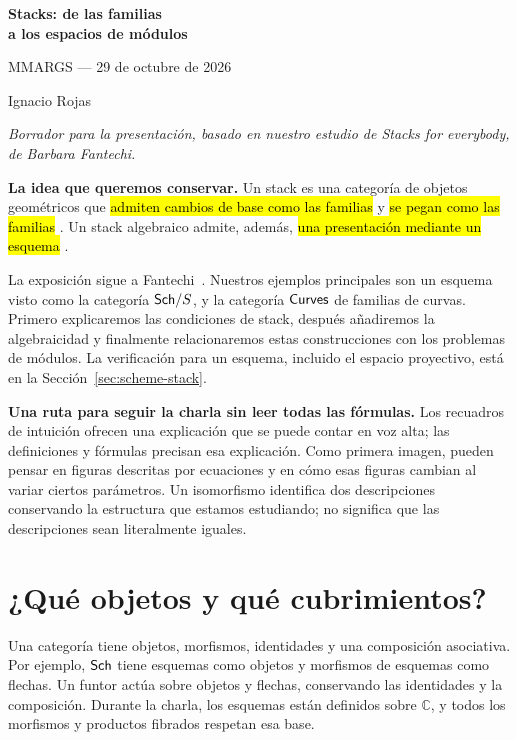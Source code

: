 \documentclass[12pt,openany]{memoir}
\makeatletter
\newcommand{\roundedhighlight}[1]{%
  \begingroup
  \setuloverlap{2pt}%
  \def\SOUL@ulunderline##1{{%
    \setbox\z@\hbox{##1}%
    \rlap{\SOUL@ulcolor{\tikz[overlay,blend mode=darken]{%
      \fill[rounded corners=2pt]
        (-\SOUL@uloverlap,-\SOUL@uldp)
        rectangle (\dimexpr\wd\z@+\SOUL@uloverlap\relax,\SOUL@ulht);%
    }}}%
    \unhcopy\z@
  }}%
  \hl{#1}%
  \endgroup
}
\DeclareRobustCommand{\hlblue}[1]{{\sethlcolor{noteblue}\roundedhighlight{#1}}}
\DeclareRobustCommand{\hlgreen}[1]{{\sethlcolor{notegreen}\roundedhighlight{#1}}}
\DeclareRobustCommand{\hlpink}[1]{{\sethlcolor{notepink}\roundedhighlight{#1}}}
\makeatother
\begin{document}
\thispagestyle{plain}

\begin{center}
  {\LARGE\bfseries Stacks: de las familias\\ a los espacios de módulos}\par
  \vspace{.5em}
  {\large MMARGS --- 29 de octubre de 2026}\par
  \vspace{.35em}
  Ignacio Rojas\par
  {\small\itshape Borrador para la presentación, basado en nuestro estudio de
  \emph{Stacks for everybody}, de Barbara Fantechi.}
\end{center}

\begin{ptcb}
\textbf{La idea que queremos conservar.}
Un stack es una categoría de objetos geométricos que
\hlgreen{admiten cambios de base como las familias} y
\hlblue{se pegan como las familias}. Un stack algebraico admite, además,
\hlpink{una presentación mediante un esquema}.
\end{ptcb}

La exposición sigue a Fantechi~\cite{fantechi}. Nuestros ejemplos principales
son un esquema visto como la categoría \(\mathsf{Sch}/S\), y la categoría
\(\mathsf{Curves}\) de familias de curvas. Primero explicaremos las condiciones de
stack, después añadiremos la algebraicidad y finalmente relacionaremos estas
construcciones con los problemas de módulos. La verificación para un esquema,
incluido el espacio proyectivo, está en la Sección~\ref{sec:scheme-stack}.

\begin{ptcb}
\textbf{Una ruta para seguir la charla sin leer todas las fórmulas.}
Los recuadros de intuición ofrecen una explicación que se puede contar en voz
alta; las definiciones y fórmulas precisan esa explicación. Como primera
imagen, pueden pensar en figuras descritas por ecuaciones y en cómo esas
figuras cambian al variar ciertos parámetros. Un isomorfismo identifica dos
descripciones conservando la estructura que estamos estudiando; no significa
que las descripciones sean literalmente iguales.
\end{ptcb}

\section{¿Qué objetos y qué cubrimientos?}
\label{sec:site}

Una categoría tiene objetos, morfismos, identidades y una composición
asociativa. Por ejemplo, \(\mathsf{Sch}\) tiene esquemas como objetos y morfismos de
esquemas como flechas. Un funtor actúa sobre objetos y flechas, conservando
las identidades y la composición. Durante la charla, los esquemas están
definidos sobre \(\mathbb C\), y todos los morfismos y productos fibrados
respetan esa base.
\end{document}
